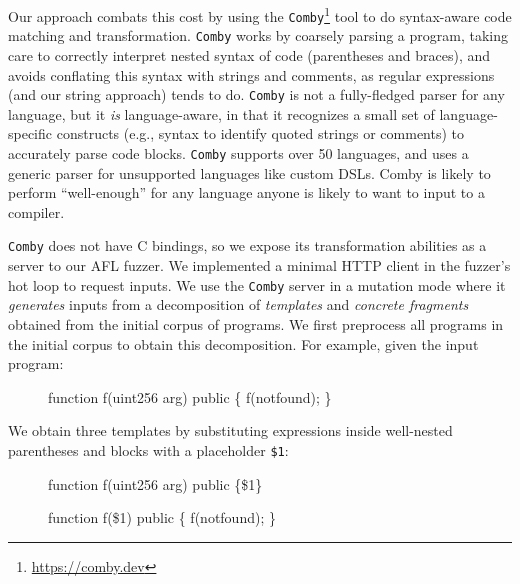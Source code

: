 Our approach combats this cost by using the
\texttt{Comby}\footnote{\href{https://comby.dev}{https://comby.dev}} tool to do
syntax-aware code matching and transformation. \texttt{Comby} works by coarsely
parsing a program, taking care to correctly interpret nested syntax of code
(parentheses and braces), and avoids conflating this syntax with strings and
comments, as regular expressions (and our string approach) tends to do.  \texttt{Comby} is not a fully-fledged
parser for any language, but it \emph{is} language-aware, in that it recognizes
a small set of language-specific constructs (e.g., syntax to identify quoted
strings or comments) to accurately parse code blocks. \texttt{Comby} supports
over 50 languages, and uses a generic parser for unsupported languages like custom
DSLs.  Comby is likely to perform ``well-enough'' for any language
anyone is likely to want to input to a compiler.

\texttt{Comby} does not have C bindings, so we expose its transformation
abilities as a server to our AFL fuzzer. We implemented a minimal HTTP client
in the fuzzer's hot loop to request inputs. We use the \texttt{Comby} server in
a mutation mode where it \emph{generates} inputs from a decomposition of
\emph{templates} and \emph{concrete fragments} obtained from the initial corpus
of programs. We first preprocess all programs in the initial corpus to obtain
this decomposition. For example, given the input program:

\begin{figure}[ht!]
\begin{code}
function f(uint256 arg) public \{
    f(notfound);
\}
\end{code}
\end{figure}

We obtain three templates by substituting expressions inside well-nested parentheses and blocks with a placeholder \texttt{\$1}:


\begin{figure}[ht!]
\begin{code}
function f(uint256 arg) public \{\$1\} 
\end{code}
\end{figure}

\begin{figure}[ht!]
\begin{code}
function f(\$1) public \{
    f(notfound);
\} 
\end{code}
\end{figure}

